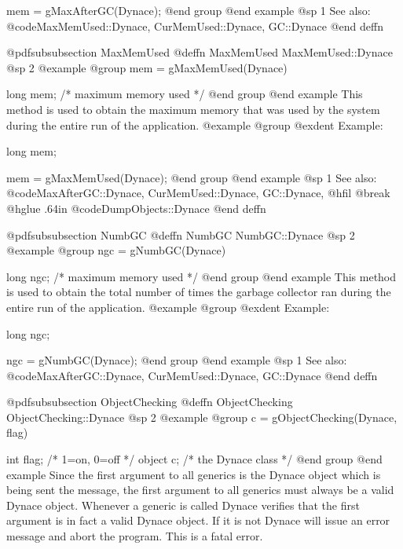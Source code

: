 mem = gMaxAfterGC(Dynace);
@end group
@end example
@sp 1
See also:  @code{MaxMemUsed::Dynace, CurMemUsed::Dynace, GC::Dynace}
@end deffn


















@pdfsubsubsection {MaxMemUsed}
@deffn {MaxMemUsed} MaxMemUsed::Dynace
@sp 2
@example
@group
mem = gMaxMemUsed(Dynace)

long    mem;    /*  maximum memory used  */
@end group
@end example
This method is used to obtain the maximum memory that was
used by the system during the entire run of the application.
@example
@group
@exdent Example:

long    mem;

mem = gMaxMemUsed(Dynace);
@end group
@end example
@sp 1
See also:  @code{MaxAfterGC::Dynace, CurMemUsed::Dynace, GC::Dynace,}
@hfil @break @hglue .64in    @code{DumpObjects::Dynace}
@end deffn









@pdfsubsubsection {NumbGC}
@deffn {NumbGC} NumbGC::Dynace
@sp 2
@example
@group
ngc = gNumbGC(Dynace)

long    ngc;    /*  maximum memory used  */
@end group
@end example
This method is used to obtain the total number of times the garbage
collector ran during the entire run of the application.
@example
@group
@exdent Example:

long    ngc;

ngc = gNumbGC(Dynace);
@end group
@end example
@sp 1
See also:  @code{MaxAfterGC::Dynace, CurMemUsed::Dynace, GC::Dynace}
@end deffn










@pdfsubsubsection {ObjectChecking}
@deffn {ObjectChecking} ObjectChecking::Dynace
@sp 2
@example
@group
c = gObjectChecking(Dynace, flag)

int     flag;   /*  1=on,  0=off   */
object  c;      /*  the Dynace class  */
@end group
@end example
Since the first argument to all generics is the Dynace object which is
being sent the message, the first argument to all generics must always
be a valid Dynace object.  Whenever a generic is called Dynace verifies that
the first argument is in fact a valid Dynace object.  If it is not Dynace
will issue an error message and abort the program.  This is a fatal
error.

